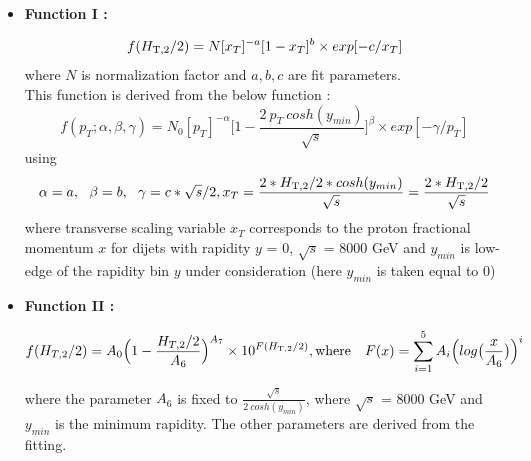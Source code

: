 \begin{itemize}
\item {\bf Function I : }

  \begin{equation}
    \label{eq:func1}
    f(H_{\mathrm{T,2}}/2) = N[x_{T}]^{-a}[1-x_{T}]^{b} \times exp[-c/x_{T}]
  \end{equation}
  where $N$ is normalization factor and $a, b, c$ are fit parameters.\\

  This function is derived from the below function \cite{CMS:2011ab} :
  \begin{equation}
    \label{eq:funcderive}
    f(p_{T};\alpha,\beta,\gamma) = N_{0}[p_{T}]^{-\alpha}\bigg[1-\frac{2~p_{T}~cosh(y_{min})}{\sqrt{s}}\bigg]^{\beta} \times exp[-\gamma/p_{T}]
  \end{equation}
  using 
  \begin{equation}
    \alpha = a,~~\beta = b,~~\gamma = c*\sqrt{s}/2, \\
    x_{T} = \frac{2*\httwons *cosh(y_{min})}{\sqrt{s}} = \frac{2*\httwons}{\sqrt{s}}
  \end{equation}
  where transverse scaling variable $x_{T}$ corresponds to the proton fractional momentum $x$ for dijets with rapidity $y$ = 0, $\sqrt{s}$ = 8000 GeV and $y_{min}$ is low-edge of the rapidity bin $y$ under consideration (here $y_{min}$ is taken equal to 0)
  
\item {\bf Function II : }

  \begin{equation}
    \label{eq:func2}
    f(H_{T,2}/2) = A_{0}\Big(1-\frac{H_{T,2}/2}{A_{6}}\Big)^{A_{7}} \times 10^{F(\httwo)}, {\rm where} ~~~{F(x) = \sum\limits_{i=1}^5 A_{i}\Big(log\big(\frac{x}{A_{6}}\big)\Big)^{i}}
  \end{equation}

  where the parameter $A_{6}$ is fixed to $\frac{\sqrt{s}}{2~cosh(y_{min})}$, where $\sqrt{s}$ = 8000 GeV and $y_{min}$ is 
  the minimum rapidity. The other parameters are derived from the fitting.
\end{itemize}

